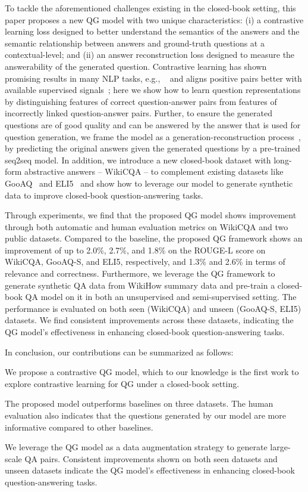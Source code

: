 \documentclass[11pt]{article}
\newcommand{\squishlist}{
 \begin{list}{}
  { \setlength{\itemsep}{0pt}
     \setlength{\parsep}{3pt}
     \setlength{\topsep}{3pt}
     \setlength{\partopsep}{0pt}
     \setlength{\leftmargin}{1.5em}
     \setlength{\labelwidth}{1em}
     \setlength{\labelsep}{0.5em} } }
\newcommand{\squishend}{
\end{list}  }
\begin{document}
To tackle the aforementioned challenges existing in the closed-book setting, this paper proposes a new QG model with two unique characteristics: (i) a contrastive learning loss designed to better understand the semantics of the answers and the semantic relationship between answers and ground-truth questions at a contextual-level; and (ii) an answer reconstruction loss designed to measure the answerability of the generated question. Contrastive learning has shown promising results in many NLP tasks, e.g., ~\cite{giorgi-etal-2021-declutr, gao-etal-2021-simcse, yang-etal-2021-contrastive-representation} and aligns positive pairs better with available supervised signals~\cite{gao-etal-2021-simcse}; here we show how to learn question representations by distinguishing features of correct question-answer pairs from features of incorrectly linked question-answer pairs. Further, to ensure the generated questions are of good quality and can be answered by the answer that is used for question generation, we frame the model as a generation-reconstruction process~\cite{cao-etal-2019-semantic, zhu2020dual}, by predicting the original answers given the generated questions by a pre-trained seq2seq model.
In addition, we introduce a new closed-book dataset with long-form abstractive answers -- WikiCQA -- to complement existing datasets like GooAQ~\cite{khashabi-etal-2021-gooaq-open} and ELI5~\cite{fan-etal-2019-eli5} and show how to leverage our model to generate synthetic data to improve closed-book question-answering tasks.

Through experiments, we find that the proposed QG model shows improvement through both automatic and human evaluation metrics on WikiCQA and two public datasets. Compared to the baseline, the proposed QG framework shows an improvement of up to 2.0\%, 2.7\%, and 1.8\% on the ROUGE-L score on WikiCQA, GooAQ-S, and ELI5, respectively, and 1.3\% and 2.6\% in terms of relevance and correctness. Furthermore, we leverage the QG framework to generate synthetic QA data from WikiHow summary data and pre-train a closed-book QA model on it in both an unsupervised and semi-supervised setting. The performance is evaluated on both seen (WikiCQA) and unseen (GooAQ-S, ELI5) datasets. We find consistent improvements across these datasets, indicating the QG model's effectiveness in enhancing closed-book question-answering tasks. 

In conclusion, our contributions can be summarized as follows:
\squishlist
\item We propose a contrastive QG model, which to our knowledge is the first work to explore contrastive learning for QG under a closed-book setting.
\item The proposed model outperforms baselines on three datasets. The human evaluation also indicates that the questions generated by our model are more informative compared to other baselines.
\item We leverage the QG model as a data augmentation strategy to generate large-scale QA pairs. Consistent improvements shown on both seen datasets and unseen datasets indicate the QG model's effectiveness in enhancing closed-book question-answering tasks.
\squishend
\end{document}
